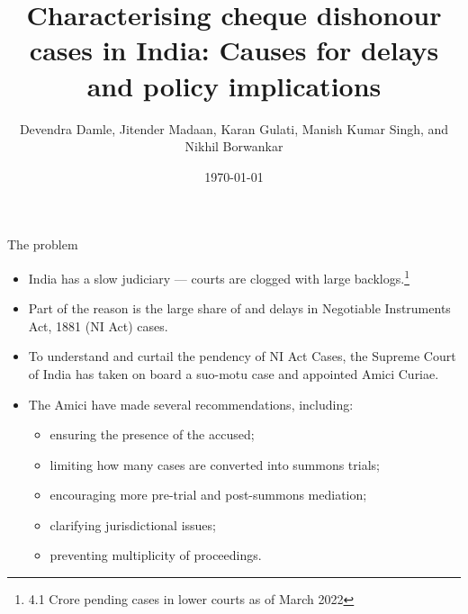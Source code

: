 \documentclass[10pt,aspectratio=169]{beamer}
\title{Characterising cheque dishonour cases in India: Causes for delays and policy implications}
\author{Devendra Damle, Jitender Madaan, Karan Gulati, Manish Kumar Singh, and Nikhil Borwankar}
\date{\today}
\begin{document}
\frame{\maketitle}

\begin{frame}{The problem}
\begin{itemize}
 \item India has a slow judiciary --- courts are clogged with large backlogs.\footnote{4.1 Crore pending cases in lower courts as of March 2022}
 \item Part of the reason is the large share of and delays in Negotiable Instruments Act, 1881 (NI Act) cases.
 \item To understand and curtail the pendency of NI Act Cases, the Supreme Court of India has taken on board a suo-motu case and appointed Amici Curiae.
 \item The Amici have made several recommendations, including:
 \begin{itemize}
 \item ensuring the presence of the accused;
 \item limiting how many cases are converted into summons trials;
 \item encouraging more pre-trial and post-summons mediation;
 \item clarifying jurisdictional issues;
 \item preventing multiplicity of proceedings.
 \end{itemize}
\end{itemize}
\end{frame}
\end{document}
